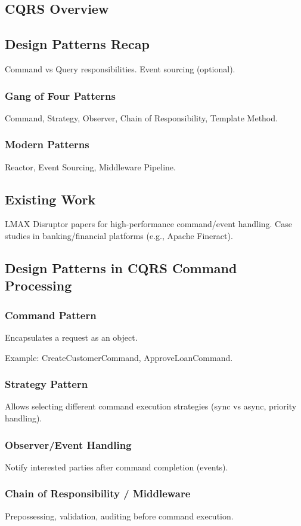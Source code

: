 \documentclass{article}
\begin{document}
\subsection{CQRS Overview}
\subsection{Design Patterns Recap}
Command vs Query responsibilities.
Event sourcing (optional).
\subsubsection{Gang of Four Patterns}
Command, Strategy, Observer, Chain of Responsibility, Template Method.
\subsubsection{Modern Patterns}
Reactor, Event Sourcing, Middleware Pipeline.
\subsection{Existing Work}
LMAX Disruptor papers for high-performance command/event handling.
Case studies in banking/financial platforms (e.g., Apache Fineract).

\subsection{Design Patterns in CQRS Command Processing}

\subsubsection{Command Pattern}  
Encapsulates a request as an object.

Example: CreateCustomerCommand, ApproveLoanCommand.

\subsubsection{Strategy Pattern}
Allows selecting different command execution strategies (sync vs async, priority handling).

\subsubsection{Observer/Event Handling}
Notify interested parties after command completion (events).

\subsubsection{Chain of Responsibility / Middleware}
Prepossessing, validation, auditing before command execution.
\end{document}
